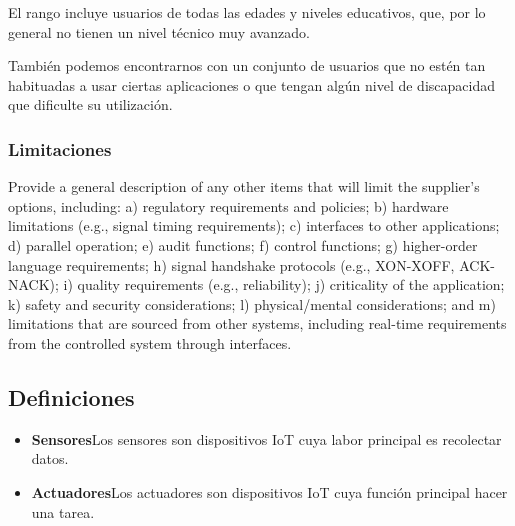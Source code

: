 \documentclass[12pt, a4paper, twoside]{article}
\newcommand\ttab{\tab \hspace{-5cm}}
\begin{document}
 El rango incluye usuarios de todas las edades y niveles educativos, que, por lo general
 no tienen un nivel técnico muy avanzado.

 También podemos encontrarnos con un conjunto de usuarios que
 no estén tan habituadas a usar ciertas aplicaciones o que tengan algún nivel de discapacidad
 que dificulte su utilización.


 \subsubsection{Limitaciones}
 Provide a general description of any other items that will limit the supplier's options, including:
 a) regulatory requirements and policies;
 b) hardware limitations (e.g., signal timing requirements);
 c) interfaces to other applications;
 d) parallel operation;
 e) audit functions;
 f) control functions;
 g) higher-order language requirements;
 h) signal handshake protocols (e.g., XON-XOFF, ACK-NACK);
 i) quality requirements (e.g., reliability);
 j) criticality of the application;
 k) safety and security considerations;
 l) physical/mental considerations; and
 m) limitations that are sourced from other systems, including real-time requirements from the
 controlled system through interfaces.

\subsection{Definiciones}
\begin{itemize}
    \item \textbf{Sensores}\ttab Los sensores son dispositivos IoT cuya labor principal es recolectar datos.
    \item \textbf{Actuadores}\ttab Los actuadores son dispositivos IoT cuya función principal hacer una tarea.
\end{itemize}
\end{document}

